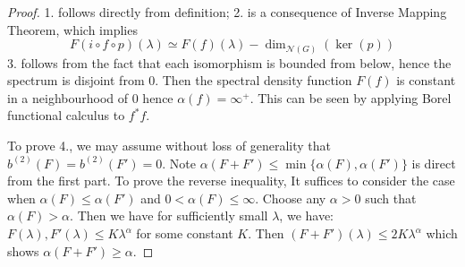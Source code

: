 \documentclass[11pt]{report}
\theoremstyle{definition}
\theoremstyle{plain}
\newcommand{\vna}{\mathcal{N}}
\begin{document}
\begin{proof}
	1. follows directly from definition; 2. is a consequence of Inverse Mapping Theorem, which implies
	\begin{equation}\label{2.11[9]}
	F(i\circ f\circ p)(\lambda)\simeq F(f)(\lambda)-\dim_{\vna(G)}(\ker(p))
	\end{equation}
		3. follows from the fact that each isomorphism is bounded from below, hence the spectrum is disjoint from $0$. Then the spectral density function $F(f)$ is constant in a neighbourhood of $0$ hence $\alpha(f)=\infty^+$. This can be seen by applying Borel functional calculus to $f^*f$.
	\par To prove 4., we may assume without loss of generality that $b^{(2)}(F)=b^{(2)}(F')=0$. Note $\alpha(F+F')\leq \min\{\alpha(F), \alpha(F') \}$ is direct from the first part. To prove the reverse inequality, It suffices to consider the case when $\alpha(F)\leq \alpha(F')$ and $0<\alpha(F)\leq \infty$. Choose any $\alpha>0$ such that $\alpha(F)>\alpha$. Then we have for sufficiently small $\lambda$, we have: $F(\lambda), F'(\lambda)\leq K\lambda^\alpha$ for some constant $K$. Then $(F+F')(\lambda)\leq 2K\lambda^\alpha$ which shows $\alpha(F+F')\geq \alpha$. 
	\end{proof}
\end{document}
